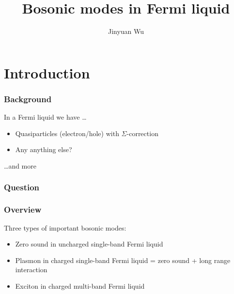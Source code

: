 \documentclass{beamer}
\title{Bosonic modes in Fermi liquid}
\author{Jinyuan Wu}
\begin{document}
\frame{\titlepage}

\section{Introduction}

\begin{frame}
\frametitle{Background}

In a Fermi liquid we have \dots
\begin{itemize}
    \item Quasiparticles (electron/hole) with $\Sigma$-correction
    \item Any anything else?
\end{itemize}    

\begin{center}
    
\end{center}

\dots and more

\end{frame}

\begin{frame}
\frametitle{Question}



\end{frame}


\begin{frame}
\frametitle{Overview}

Three types of important bosonic modes:

\begin{itemize}
    \item Zero sound in uncharged single-band Fermi liquid
    \item Plasmon in charged single-band Fermi liquid = zero sound + long range interaction 
    \item Exciton in charged multi-band Fermi liquid
\end{itemize}

\end{frame}
\end{document}
